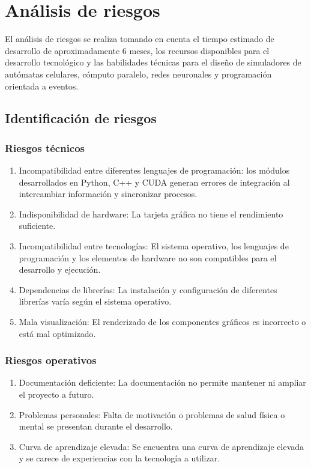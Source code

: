 \section{Análisis de riesgos}

El análisis de riesgos se realiza tomando en cuenta el tiempo estimado de desarrollo de aproximadamente 6 meses, los recursos disponibles para el desarrollo tecnológico y las habilidades técnicas para el diseño de simuladores de autómatas celulares, cómputo paralelo, redes neuronales y programación orientada a eventos. 

\subsection{Identificación de riesgos}

\subsubsection{Riesgos técnicos}

\begin{enumerate}[label*=RT\arabic*]
	\item Incompatibilidad entre diferentes lenguajes de programación: los módulos desarrollados en Python, C++ y CUDA generan errores de integración al intercambiar información y sincronizar procesos.
	
	\item Indisponibilidad de hardware: La tarjeta gráfica no tiene el rendimiento suficiente.
	
	\item Incompatibilidad entre tecnologías: El sistema operativo, los lenguajes de programación y los elementos de hardware no son compatibles para el desarrollo y ejecución.
	
	\item Dependencias de librerías: La instalación y configuración de diferentes librerías varía según el sistema operativo.
	
	\item Mala visualización: El renderizado de los componentes gráficos es incorrecto o está mal optimizado.
\end{enumerate}

\subsubsection{Riesgos operativos}
\begin{enumerate}[label*=RO\arabic*]
	\item Documentación deficiente: La documentación no permite mantener ni ampliar el proyecto a futuro.
	
	\item Problemas personales: Falta de motivación o problemas de salud física o mental se presentan durante el desarrollo.
	
	\item Curva de aprendizaje elevada: Se encuentra una curva de aprendizaje elevada y se carece de experiencias con la tecnología a utilizar.
\end{enumerate}
